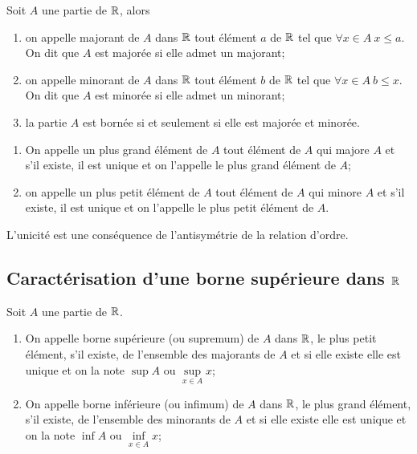 Soit \(A\) une partie de \(\mathbb{R}\), alors
\begin{defdef}
  \begin{enumerate}
    \item on appelle majorant de \(A\) dans \(\mathbb{R}\) tout élément \(a\) de \(\mathbb{R}\)
      tel que \(\forall x \in A \ x\leqslant a\). On dit que \(A\) est majorée
      si elle admet un majorant;
    \item on appelle minorant de \(A\) dans \(\mathbb{R}\) tout élément \(b\) de \(\mathbb{R}\)
      tel que \(\forall x \in A \ b\leqslant x\). On dit que \(A\) est minorée
      si elle admet un minorant;
    \item la partie \(A\) est bornée si et seulement si elle est majorée et
      minorée.
  \end{enumerate}
\end{defdef}

\begin{defdef}
  \begin{enumerate}
    \item On appelle un plus grand élément de \(A\) tout élément de \(A\) qui
      majore \(A\) et s'il existe, il est unique et on l'appelle le plus grand
      élément de \(A\);
    \item on appelle un plus petit élément de \(A\) tout élément de \(A\) qui
      minore \(A\) et s'il existe, il est unique et on l'appelle le plus petit
      élément de \(A\).
  \end{enumerate}
\end{defdef}
L'unicité est une conséquence de l'antisymétrie de la relation d'ordre.

\subsection{Caractérisation d'une borne supérieure dans \(\mathbb{R}\)}

Soit \(A\) une partie de \(\mathbb{R}\).
\begin{defdef}
  \begin{enumerate}
    \item On appelle borne supérieure (ou supremum) de \(A\) dans \(\mathbb{R}\), le
      plus petit élément, s'il existe, de l'ensemble des majorants de \(A\) et
      si elle existe elle est unique et on la note \(\sup A\) ou
      \(\sup\limits_{x\in A} x\);
    \item On appelle borne inférieure (ou infimum) de \(A\) dans \(\mathbb{R}\), le plus
      grand élément, s'il existe, de l'ensemble des minorants de \(A\) et si
      elle existe elle est unique et on la note \(\inf A\) ou
      \(\inf\limits_{x\in A} x\);
  \end{enumerate}
\end{defdef}

